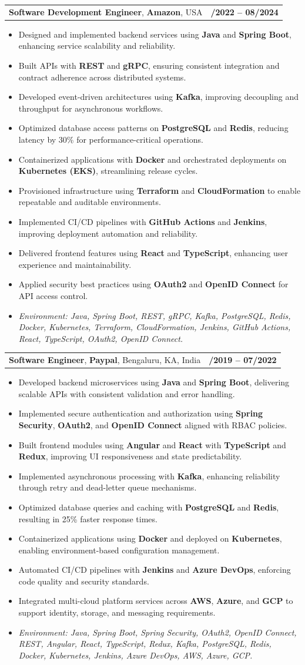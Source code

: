 \documentclass[letterpaper,11pt]{article}
\makeatletter
\newcommand{\resumeItem}[1]{
  \item\footnotesize{
    {#1 \vspace{-2pt}}
  }
}
\newcommand{\resumeSubheading}[4]{
  \vspace{-2pt}\item
    \begin{tabular*}{1.0\textwidth}[t]{l@{\extracolsep{\fill}}r}
      \textbf{\fontsize{10pt}{14pt}\selectfont #3}, \textbf{\fontsize{10pt}{14pt}\selectfont #1}, \fontsize{10pt}{14pt}\selectfont #4 & \textbf{\fontsize{10pt}{14pt}\selectfont #2} \\
    \end{tabular*}\vspace{-7pt}
}
\newcommand{\resumeItemListStart}{\begin{itemize}[leftmargin=*]}
\newcommand{\resumeItemListEnd}{\end{itemize}\vspace{-5pt}}
\makeatother
\begin{document}
\resumeSubheading
{Amazon}{10/2022 -- 08/2024}
{Software Development Engineer}{USA}
\resumeItemListStart
  \resumeItem{Designed and implemented backend services using \textbf{Java} and \textbf{Spring Boot}, enhancing service scalability and reliability.}
  \resumeItem{Built APIs with \textbf{REST} and \textbf{gRPC}, ensuring consistent integration and contract adherence across distributed systems.}
  \resumeItem{Developed event-driven architectures using \textbf{Kafka}, improving decoupling and throughput for asynchronous workflows.}
  \resumeItem{Optimized database access patterns on \textbf{PostgreSQL} and \textbf{Redis}, reducing latency by 30\% for performance-critical operations.}
  \resumeItem{Containerized applications with \textbf{Docker} and orchestrated deployments on \textbf{Kubernetes (EKS)}, streamlining release cycles.}
  \resumeItem{Provisioned infrastructure using \textbf{Terraform} and \textbf{CloudFormation} to enable repeatable and auditable environments.}
  \resumeItem{Implemented CI/CD pipelines with \textbf{GitHub Actions} and \textbf{Jenkins}, improving deployment automation and reliability.}
  \resumeItem{Delivered frontend features using \textbf{React} and \textbf{TypeScript}, enhancing user experience and maintainability.}
  \resumeItem{Applied security best practices using \textbf{OAuth2} and \textbf{OpenID Connect} for API access control.}
  \resumeItem{\textit{Environment: Java, Spring Boot, REST, gRPC, Kafka, PostgreSQL, Redis, Docker, Kubernetes, Terraform, CloudFormation, Jenkins, GitHub Actions, React, TypeScript, OAuth2, OpenID Connect.}}
\resumeItemListEnd

\resumeSubheading
{Paypal}{08/2019 -- 07/2022}
{Software Engineer}{Bengaluru, KA, India}
\resumeItemListStart
  \resumeItem{Developed backend microservices using \textbf{Java} and \textbf{Spring Boot}, delivering scalable APIs with consistent validation and error handling.}
  \resumeItem{Implemented secure authentication and authorization using \textbf{Spring Security}, \textbf{OAuth2}, and \textbf{OpenID Connect} aligned with RBAC policies.}
  \resumeItem{Built frontend modules using \textbf{Angular} and \textbf{React} with \textbf{TypeScript} and \textbf{Redux}, improving UI responsiveness and state predictability.}
  \resumeItem{Implemented asynchronous processing with \textbf{Kafka}, enhancing reliability through retry and dead-letter queue mechanisms.}
  \resumeItem{Optimized database queries and caching with \textbf{PostgreSQL} and \textbf{Redis}, resulting in 25\% faster response times.}
  \resumeItem{Containerized applications using \textbf{Docker} and deployed on \textbf{Kubernetes}, enabling environment-based configuration management.}
  \resumeItem{Automated CI/CD pipelines with \textbf{Jenkins} and \textbf{Azure DevOps}, enforcing code quality and security standards.}
  \resumeItem{Integrated multi-cloud platform services across \textbf{AWS}, \textbf{Azure}, and \textbf{GCP} to support identity, storage, and messaging requirements.}
  \resumeItem{\textit{Environment: Java, Spring Boot, Spring Security, OAuth2, OpenID Connect, REST, Angular, React, TypeScript, Redux, Kafka, PostgreSQL, Redis, Docker, Kubernetes, Jenkins, Azure DevOps, AWS, Azure, GCP.}}
\resumeItemListEnd
\end{document}
